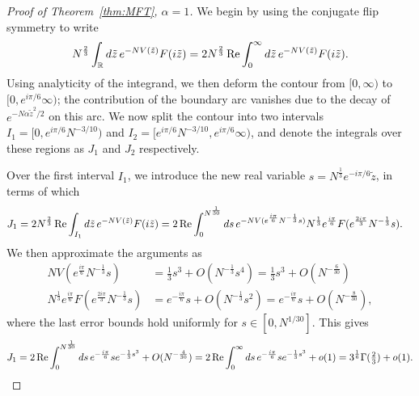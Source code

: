 \documentclass[11pt]{amsart}
\numberwithin{equation}{section}
\numberwithin{theorem}{section}
\begin{document}
\begin{proof}[Proof of Theorem~\ref{thm:MFT}, $\alpha=1$]
We begin by using the conjugate flip symmetry to write
\begin{align}
  N^{\frac{2}{3}}\int_{\mathbb{R}} d\tilde z\, e^{-NV(\tilde z)} F(i\tilde z)
  = 2 N^{\frac{2}{3}}\operatorname{Re}\int_{0}^\infty d\tilde z\, e^{-NV(\tilde z)} F(i\tilde z).
\end{align}
Using analyticity of the integrand, we then deform the contour from $[0, \infty)$ to $[0, e^{i\pi/6}\infty)$;
the contribution of the boundary arc
vanishes due to the decay of $e^{-N\alpha\tilde z^2/2}$ on this arc.
We now split the contour into two intervals $I_1 = [0, e^{i\pi/6}N^{-3/10})$ and $ I_2 = [e^{i\pi/6}N^{-3/10},e^{i\pi/6} \infty)$,
and denote the integrals over these regions as $J_1$ and $J_2$ respectively. 

Over the first interval $I_1$, we introduce the new real variable $s = N^{\frac{1}{3}}e^{-i\pi/6}\tilde{z}$, in terms of which
\begin{align}
  J_1 = 2N^{\frac{2}{3}}\operatorname{Re}\int_{I_1} d\tilde z\, e^{-NV(\tilde z)} F(i\tilde z)
  &= 2\operatorname{Re}\int_{0}^{N^{\frac{1}{30}}} ds\, e^{-NV(e^{\frac{i\pi}{6}}N^{-\frac{1}{3}}s)} N^{\frac{1}{3}}e^{\frac{i\pi}{6}}F(e^{\frac{2i\pi}{3}}N^{-\frac{1}{3}}s).
\end{align}
We then approximate the arguments as
\begin{align}
  NV(e^{\frac{i\pi}{6}}N^{-\frac{1}{3}}s) &= \frac{1}{3}s^3 + {O}(N^{-\frac{1}{3}}s^4)
  = \frac{1}{3}s^3 + {O}(N^{-\frac{6}{30}})\\
  N^{\frac{1}{3}}e^{\frac{i\pi}{6}}F(e^{\frac{2i\pi}{3}}N^{-\frac{1}{3}}s)
                                          &= e^{-\frac{i\pi}{6}}s + {O}(N^{-\frac{1}{3}}s^2)
                                          = e^{-\frac{i\pi}{6}}s + {O}(N^{-\frac{8}{30}}),
\end{align}
where the last error bounds hold uniformly for $s\in [0,N^{1/30}]$.
This gives
\begin{equation}
  J_1
  = 2\operatorname{Re}\int_{0}^{N^\frac{1}{30}} ds\, e^{-\frac{i\pi}{6}}se^{-\frac{1}{3}s^3}  + {O}(N^{-\frac{4}{30}})
  = 2\operatorname{Re}\int_{0}^{\infty} ds\, e^{-\frac{i\pi}{6}}se^{-\frac{1}{3}s^3}  + o(1)
  =3^{\frac{1}{6}}\Gamma(\tfrac{2}{3})+o(1).
\end{equation}



\end{proof}
\end{document}
